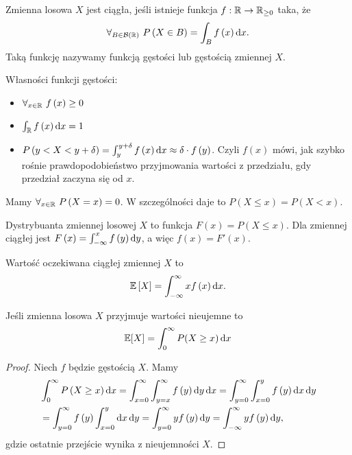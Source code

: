 \begin{definition}
	Zmienna losowa \(X\) jest ciągła, jeśli istnieje funkcja \(f: \mathbb{R}\to \mathbb{R}_{\ge 0}\) taka, że
	\[\forall_{B\in \mathcal{B\left( \mathbb{R} \right) }} \ P\left( X\in B  \right) = \int_{B} f\left( x  \right) \mathop{}\!\mathrm{d} x .\]
	Taką funkcję nazywamy funkcją gęstości lub gęstością zmiennej \(X\).
\end{definition}

Własności funkcji gęstości:
\begin{itemize}
	\item \(\forall_{x\in \mathbb{R}} \ f\left( x  \right) \ge 0 \)
	\item \(\int_{\mathbb{R}} f\left( x  \right) \mathop{}\!\mathrm{d} x = 1\)
	\item \(P\left( y<X<y+\delta \right) = \int_{y}^{y+\delta} f\left( x  \right) \mathop{}\!\mathrm{d} x \approx \delta\cdot f\left( y \right)  \). Czyli \(f\left( x  \right) \) mówi, jak szybko rośnie prawdopodobieństwo przyjmowania wartości z przedziału, gdy przedział zaczyna się od \(x\).
\end{itemize}

Mamy \(\forall_{x\in \mathbb{R}} \ P\left( X=x \right) =0 \). W szczególności daje to \(P\left( X\le x  \right) = P\left( X<x \right) \).

\begin{definition}
	Dystrybuanta zmiennej losowej \(X\) to funkcja \(F\left( x  \right) = P\left( X\le x  \right) \). Dla zmiennej ciągłej jest \(F\left( x  \right) = \int_{-\infty}^{x} f\left( y  \right) \mathop{}\!\mathrm{d} y \), a więc \(f\left( x  \right) = F'\left( x  \right) \).
\end{definition}

\begin{definition}
	Wartość oczekiwana ciągłej zmiennej \(X\) to
	\[ \mathbb{E}\left[  X \right] = \int_{-\infty}^{\infty} x f\left( x  \right) \mathop{}\!\mathrm{d} x  .\]
\end{definition}


\begin{lemma}[Lemat 8.1 P\&C]
	\label{continuous-positive-random-variable-lemma}
	Jeśli zmienna losowa \(X\) przyjmuje wartości nieujemne to
	\[
		\expected{X} = \int_0^\infty P(X \geq x) \diff x
	\]
\end{lemma}
\begin{proof}
	Niech \(f\) będzie gęstością \(X\). Mamy
	\begin{align*}
		 & \int_{0}^{\infty} P\left( X\ge x  \right) \diff x = \int_{x=0}^{\infty}  \int_{y=x}^{\infty} f\left( y  \right) \diff y \diff x = \int_{y=0}^{\infty} \int_{x=0}^{y} f\left( y  \right) \diff x \diff y \\
		 & = \int_{y=0}^{\infty} f\left( y  \right) \int_{x=0}^{y} \diff x \diff y = \int_{y=0}^{\infty} y f\left( y  \right) \diff y = \int_{-\infty}^{\infty} y f\left( y  \right) \diff y,
	\end{align*}
	gdzie ostatnie przejście wynika z nieujemności \(X\).
\end{proof}

